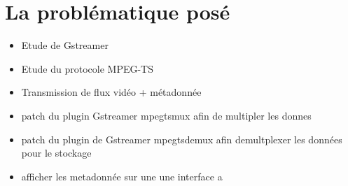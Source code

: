 \chapter{La problématique posé}
\begin{itemize}
  \item Etude de Gstreamer
  \item Etude du protocole MPEG-TS
  \item Transmission de flux vidéo + métadonnée
  \item patch du plugin Gstreamer mpegtsmux afin de  multipler les donnes
  \item patch du plugin de Gstreamer mpegtsdemux afin demultplexer les données pour le stockage
  \item afficher les metadonnée sur une une interface a
\end{itemize}

